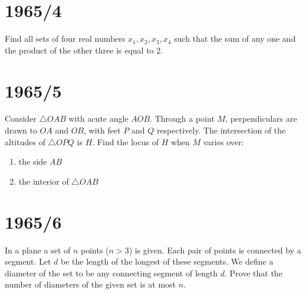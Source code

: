 \documentclass[12pt]{article}
\begin{document}
\section*{1965/4}
Find all sets of four real numbers $x_1, x_2, x_3, x_4$ such that the sum of any one and the product of the other three is equal to 2.
\section*{1965/5}
Consider $\triangle OAB$ with acute angle $AOB$. Through a point $M$, perpendiculars are drawn to $OA$ and $OB$, with feet $P$ and $Q$ respectively. The intersection of the altitudes of $\triangle OPQ$ is $H$. Find the locus of $H$ when $M$ varies over:
\begin{enumerate}
\item the side $AB$
\item the interior of $\triangle OAB$
\end{enumerate}
\section*{1965/6}
In a plane a set of $n$ points ($n > 3$) is given. Each pair of points is connected by a segment. Let $d$ be the length of the longest of these segments. We define a diameter of the set to be any connecting segment of length $d$. Prove that the number of diameters of the given set is at most $n$.
\end{document}
